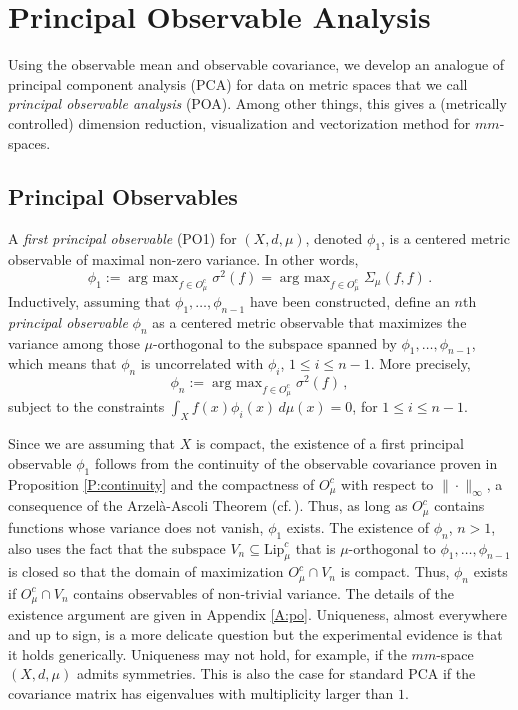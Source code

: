 \documentclass[11pt]{article}
\theoremstyle{definition}
\newcommand{\lip}{\ensuremath{\text{Lip}}}
\newcommand{\cobs}[1]{\ensuremath{O^c_{#1}}}
\begin{document}

\section{Principal Observable Analysis} \label{S:poa}

Using the observable mean and observable covariance, we develop an analogue of principal component analysis (PCA) for data on metric spaces that we call {\em principal observable analysis} (POA). Among other things, this gives a (metrically controlled) dimension reduction, visualization and vectorization method for $mm$-spaces.

\subsection{Principal Observables}

A {\em first principal observable} (PO1) for $(X,d,\mu)$, denoted $\phi_1$, is a centered metric observable of maximal non-zero variance. In other words,
\begin{equation}
\phi_1:= \mathop{\text{arg max}}_{f \in \cobs{\mu}} \sigma^2 (f) =  \mathop{\text{arg max}}_{f \in \cobs{\mu}} \Sigma_\mu(f,f) \,.
\end{equation}
Inductively, assuming that $\phi_1, \ldots, \phi_{n-1}$ have been constructed, define an $n$th {\em principal observable} $\phi_n$ as a centered metric observable that maximizes the variance among those $\mu$-orthogonal to the subspace spanned by $\phi_1, \ldots, \phi_{n-1}$, which means that $\phi_n$ is uncorrelated with $\phi_i$, $1 \leq i \leq n-1$. More precisely,
\begin{equation}
\phi_n:= \mathop{\text{arg max}}_{f \in \cobs{\mu}} \sigma^2 (f) \,,
\end{equation}
subject to the constraints $\int_X f(x) \phi_i (x) \, d\mu (x) =0$, for $1 \leq i \leq n-1$.

Since we are assuming that $X$ is compact, the existence of a first principal observable $\phi_1$ follows from the continuity of the observable covariance proven in Proposition \ref{P:continuity} and the compactness of $\cobs{\mu}$ with respect to $\|\cdot\|_\infty$, a consequence of the Arzel\`{a}-Ascoli Theorem (cf.\,\cite[Theorem~2.4.7]{dudley2002real}). Thus, as long as $\cobs{\mu}$ contains functions whose variance does not vanish, $\phi_1$ exists. The existence of $\phi_n$, $n>1$, also uses the fact that the subspace $V_n \subseteq \lip^c_\mu$ that is $\mu$-orthogonal to $\phi_1, \ldots, \phi_{n-1}$ is closed so that the domain of maximization $\cobs{\mu} \cap V_n$ is compact. Thus, $\phi_n$ exists if $\cobs{\mu} \cap V_n$ contains observables of non-trivial variance. The details of the existence argument are given in Appendix \ref{A:po}. Uniqueness, almost everywhere and up to sign, is a more delicate question but the experimental evidence is that it holds generically. Uniqueness may not hold, for example, if the $mm$-space $(X,d,\mu)$ admits symmetries. This is also the case for standard PCA  if the covariance matrix has eigenvalues with multiplicity larger than $1$.
\end{document}
